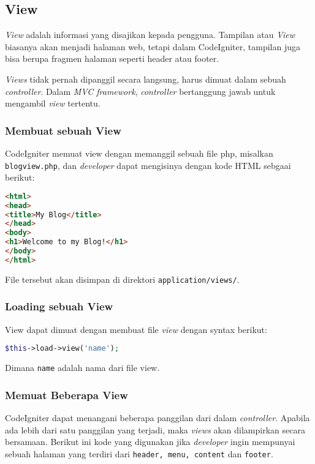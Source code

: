 \subsection{View}
\textit{View } adalah informasi yang disajikan kepada pengguna. Tampilan atau \textit{View} biasanya akan menjadi halaman web, tetapi dalam CodeIgniter, tampilan juga bisa berupa fragmen halaman seperti header atau footer. 

\textit{Views} tidak pernah dipanggil secara langsung, harus dimuat dalam sebuah \textit{controller}. Dalam \textit{MVC framework}, \textit{controller} bertanggung jawab untuk mengambil \textit{view} tertentu. 

\subsubsection{Membuat sebuah View}
CodeIgniter memuat view dengan memanggil sebuah file php, misalkan \verb|blogview.php|, dan \textit{developer} dapat mengisinya dengan kode HTML sebgaai berikut:
\begin{lstlisting}[frame=single, language=HTML, label={lst:viewCI}, caption=Contoh view pada CodeIgniter.] 
<html>
<head>
<title>My Blog</title>
</head>
<body>
<h1>Welcome to my Blog!</h1>
</body>
</html>
\end{lstlisting}

File tersebut akan disimpan di direktori \texttt{application/views/}.

\subsubsection{Loading sebuah View}


View dapat dimuat dengan membuat file \textit{view} dengan syntax berikut:

\begin{lstlisting}[frame=single, language=PHP, label={lst:loadViewCI}, caption=Contoh load view pada CodeIgniter.] 
$this->load->view('name');
\end{lstlisting}

\noindent Dimana \texttt{name} adalah nama dari file view.

\subsubsection{Memuat Beberapa View}

CodeIgniter dapat menangani beberapa panggilan dari dalam \textit{controller}. Apabila ada lebih dari satu panggilan yang terjadi, maka \textit{views} akan dilampirkan secara bersamaan. Berikut ini kode yang digunakan jika \textit{developer} ingin mempunyai sebuah halaman yang terdiri dari \texttt{header, menu, content} dan \texttt{footer}. 



